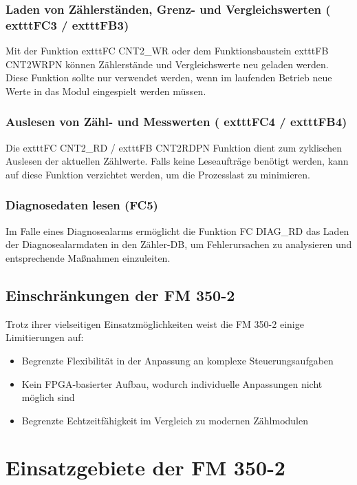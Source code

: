 \subsubsection{Laden von Zählerständen, Grenz- und Vergleichswerten (	exttt{FC3} / 	exttt{FB3})}

Mit der Funktion 	exttt{FC CNT2\_WR} oder dem Funktionsbaustein 	exttt{FB CNT2WRPN} können Zählerstände und Vergleichswerte neu geladen werden. Diese Funktion sollte nur verwendet werden, wenn im laufenden Betrieb neue Werte in das Modul eingespielt werden müssen.

\subsubsection{Auslesen von Zähl- und Messwerten (	exttt{FC4} / 	exttt{FB4})}

Die 	exttt{FC CNT2\_RD} / 	exttt{FB CNT2RDPN} Funktion dient zum zyklischen Auslesen der aktuellen Zählwerte. Falls keine Leseaufträge benötigt werden, kann auf diese Funktion verzichtet werden, um die Prozesslast zu minimieren.

\subsubsection{Diagnosedaten lesen (FC5)}

Im Falle eines Diagnosealarms ermöglicht die Funktion FC DIAG\_RD das Laden der Diagnosealarmdaten in den Zähler-DB, um Fehlerursachen zu analysieren und entsprechende Maßnahmen einzuleiten.

\subsection{Einschränkungen der FM 350-2}

Trotz ihrer vielseitigen Einsatzmöglichkeiten weist die FM 350-2 einige Limitierungen auf:
\begin{itemize}
    \item Begrenzte Flexibilität in der Anpassung an komplexe Steuerungsaufgaben
    \item Kein FPGA-basierter Aufbau, wodurch individuelle Anpassungen nicht möglich sind
    \item Begrenzte Echtzeitfähigkeit im Vergleich zu modernen Zählmodulen
\end{itemize}

\section{Einsatzgebiete der FM 350-2}

